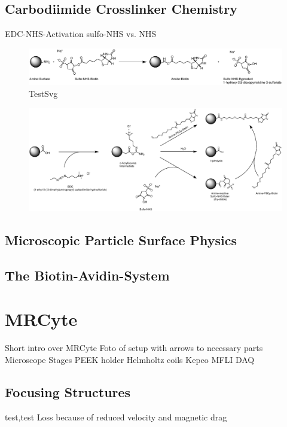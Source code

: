 \subsection{Carbodiimide Crosslinker Chemistry}
EDC-NHS-Activation
sulfo-NHS vs. NHS
\begin{figure}[htb!]
\centering
\includegraphics[width=\textwidth]{./Ressources/Chemistry/Sulfo-NHS.eps}
\caption{TestSvg}
\label{fig:Chem:NH2-NHS}
\end{figure}

\begin{figure}[htb!]
\centering
\includegraphics[width=\textwidth]{./Ressources/Chemistry/EDC-NHS.eps}
\label{fig:Chem:COOH-EDC-NHS}
\end{figure}
\subsection{Microscopic Particle Surface Physics}

\subsection{The Biotin-Avidin-System}


\section{MRCyte}
Short intro over MRCyte
Foto of setup with arrows to necessary parts
Microscope
Stages
PEEK holder
Helmholtz coils
Kepco
MFLI
DAQ
\subsection{Focusing Structures}
test,test
Loss because of reduced velocity and magnetic drag
